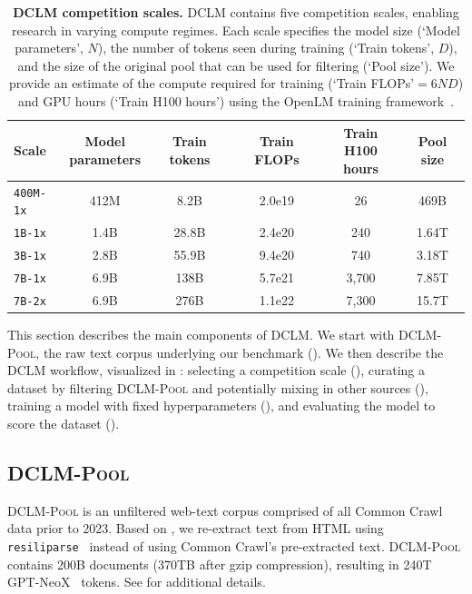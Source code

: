 \documentclass{article}
\newcommand{\dclm}{\textsc{DCLM}\xspace}
\newcommand{\rawpool}{\textsc{DCLM-Pool}\xspace}
\newcommand{\xstrack}{\texttt{400M-1x}\xspace}
\newcommand{\strack}{\texttt{1B-1x}\xspace}
\newcommand{\mtrack}{\texttt{3B-1x}\xspace}
\newcommand{\ltrack}{\texttt{7B-1x}\xspace}
\newcommand{\xltrack}{\texttt{7B-2x}\xspace}
\newcommand{\resiliparse}{\texttt{resiliparse}\xspace}
\newcommand{\commoncrawl}{Common Crawl\xspace}
\newcommand{\numpooldocuments}{200B\xspace}
\newcommand{\numpooltokens}{240T\xspace}
\begin{document}
\begin{table}[t]
\centering
\caption{
\textbf{\dclm competition scales.} \dclm{} contains five competition scales, enabling research in varying compute regimes.
Each scale specifies the model size (`Model parameters', $N$), the number of tokens seen during training (`Train tokens', $D$), and the size of the original pool that can be used for filtering (`Pool size'). We provide an estimate of the compute required for training (`Train FLOPs'$=6ND$) and GPU hours (`Train H100 hours') using the OpenLM training framework~\citep{open_lm}.}
\begin{tabular}{lccccc}

\toprule
Scale & \makecell{Model\\ parameters} & Train tokens & Train FLOPs & \makecell{Train\\ H100 hours} & Pool size\\ 
\midrule
\xstrack & 412M & 8.2B & 2.0e19 & 26 & 469B \\ 
\strack & 1.4B & 28.8B & 2.4e20 & 240 & 1.64T\\ 
\mtrack & 2.8B & 55.9B & 9.4e20 & 740 & 3.18T \\ 
\ltrack & 6.9B & 138B & 5.7e21 & 3,700 & 7.85T\\ 
\xltrack & 6.9B & 276B & 1.1e22 & 7,300 & 15.7T\\ 
\bottomrule
\end{tabular}

\label{tab:models}
\end{table}

This section describes the main components of \dclm.
We start with \rawpool, the raw text corpus underlying our benchmark  ().
We then describe the \dclm workflow, visualized in : selecting a competition scale (), curating a dataset by filtering \rawpool and potentially mixing in other sources (), training a model with fixed hyperparameters (), and evaluating the model to score the dataset ().

\subsection{\rawpool}\label{sec:rawpool}
\rawpool is an unfiltered web-text corpus comprised of all \commoncrawl~\citep{commoncrawl} data prior to 2023.
Based on , we re-extract text from HTML using \resiliparse~\citep{resiliparse1,resiliparse2} instead of using \commoncrawl's pre-extracted text.
\rawpool contains \numpooldocuments documents (370TB after gzip compression),  resulting in \numpooltokens GPT-NeoX~\citep{neox} tokens.
See  for additional details.
\end{document}

